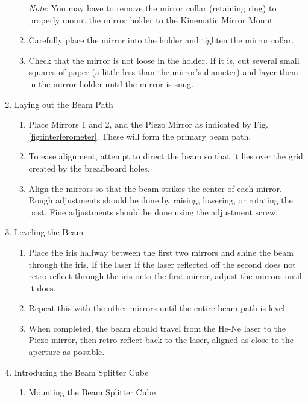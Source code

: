 \begin{enumerate}
\begin{enumerate}
        \emph{Note}: You may have to remove the mirror collar (retaining ring)
        to properly mount the mirror holder to the Kinematic Mirror Mount.
        \item Carefully place the mirror into the holder and tighten the mirror
        collar.
        \item Check that the mirror is not loose in the holder. If it is, cut
        several small squares of paper (a little less than the mirror's
        diameter) and layer them in the mirror holder until the mirror is snug.
        \end{enumerate}
    \item Laying out the Beam Path
        \begin{enumerate}
        \item Place Mirrors 1 and 2, and the Piezo Mirror as indicated by Fig.
        \ref{fig:interferometer}. These will form the primary beam path. 
        \item To ease alignment, attempt to direct the beam so that it lies over
        the grid created by the breadboard holes.
        \item Align the mirrors so that the beam strikes the center of each
        mirror. Rough adjustments should be done by raising, lowering, or
        rotating the post. Fine adjustments should be done using the adjustment
        screw.
        \end{enumerate}
    \item Leveling the Beam
    \label{step:leveling}
        \begin{enumerate}
        \item Place the iris halfway between the first two mirrors and shine the
        beam through the iris. If the laser If the laser reflected off the
        second does not retro-reflect through the iris onto the first mirror,
        adjust the mirrors until it does.
        \item Repeat this with the other mirrors until the entire beam path is
        level.
        \item When completed, the beam should travel from the He-Ne laser to the
        Piezo mirror, then retro reflect back to the laser, aligned as close to
        the aperture as possible.
        \end{enumerate}
    \item Introducing the Beam Splitter Cube
        \begin{enumerate}
        \item Mounting the Beam Splitter Cube

\end{enumerate}
\end{enumerate}
